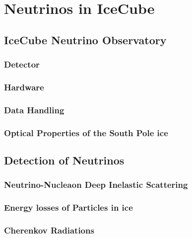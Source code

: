\chapter{Neutrinos in IceCube}

\section{IceCube Neutrino Observatory}
\label{sec:IC_detector}
\subsection{Detector}
\subsection{Hardware}
\subsection{Data Handling}
\subsection{Optical Properties of the South Pole ice}


\section{Detection of Neutrinos}

\label{sec:nu_detection}

\subsection{Neutrino-Nucleaon Deep Inelastic Scattering}
\subsection{Energy losses of Particles in ice}
\subsection{Cherenkov Radiations}

